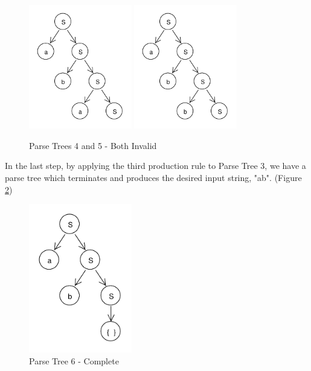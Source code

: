 \documentclass[11pt]{article}
\begin{document}
\begin{figure}[h!]
    \centering
    \includegraphics[width=0.4\textwidth,natwidth=30,natheight=30]{umlet/rdp_4.pdf}
    \includegraphics[width=0.4\textwidth,natwidth=30,natheight=30]{umlet/rdp_5.pdf}
    \caption{Parse Trees 4 and 5 - Both Invalid}
    \label{fig:rdp_4_5}
\end{figure}

In the last step, by applying the third production rule to Parse Tree 3, we have a parse tree which terminates and produces the
desired input string, "ab". (Figure \ref{fig:rdp_6})

\begin{figure}[h!]
    \centering
    \includegraphics[width=0.4\textwidth,natwidth=30,natheight=30]{umlet/rdp_6.pdf}
    \caption{Parse Tree 6 - Complete}
    \label{fig:rdp_6}
\end{figure}
\end{document}
